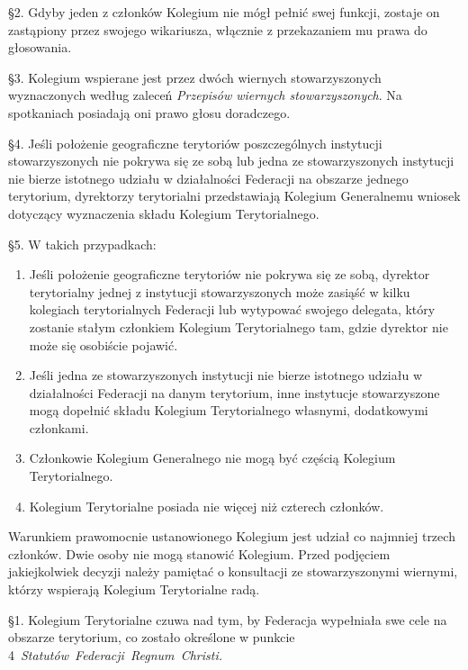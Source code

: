 \S{}2. Gdyby jeden z członków Kolegium nie mógł pełnić swej funkcji, zostaje on zastąpiony przez swojego wikariusza, włącznie z przekazaniem mu prawa do głosowania.

\S{}3. Kolegium wspierane jest przez dwóch wiernych stowarzyszonych wyznaczonych według zaleceń {\em Przepisów wiernych stowarzyszonych}. Na spotkaniach posiadają oni prawo głosu doradczego.

\S{}4. Jeśli położenie geograficzne terytoriów poszczególnych instytucji stowarzyszonych nie pokrywa się ze sobą lub jedna ze stowarzyszonych instytucji nie bierze istotnego udziału w działalności Federacji na obszarze jednego terytorium, dyrektorzy terytorialni przedstawiają Kolegium Generalnemu wniosek dotyczący wyznaczenia składu Kolegium Terytorialnego.

\S{}5. W takich przypadkach:
\begin{enumerate}
	
	\item Jeśli położenie geograficzne terytoriów nie pokrywa się ze sobą, dyrektor terytorialny jednej z instytucji stowarzyszonych może zasiąść w kilku kolegiach terytorialnych Federacji lub wytypować swojego delegata, który zostanie stałym członkiem Kolegium Terytorialnego tam, gdzie dyrektor nie może się osobiście pojawić.
	
	\item Jeśli jedna ze stowarzyszonych instytucji nie bierze istotnego udziału w działalności Federacji na danym terytorium, inne instytucje stowarzyszone mogą dopełnić składu Kolegium Terytorialnego własnymi, dodatkowymi członkami.
	
	\item Członkowie Kolegium Generalnego nie mogą być częścią Kolegium Terytorialnego.
	
	\item Kolegium Terytorialne posiada nie więcej niż czterech członków.
\end{enumerate}

 Warunkiem prawomocnie ustanowionego Kolegium jest udział co najmniej trzech członków. Dwie osoby nie mogą stanowić Kolegium. Przed podjęciem jakiejkolwiek decyzji należy pamiętać o konsultacji ze stowarzyszonymi wiernymi, którzy wspierają Kolegium Terytorialne radą.

\filbreak{}

 \S{}1. Kolegium Terytorialne czuwa nad tym, by Federacja wypełniała swe cele na obszarze terytorium, co zostało określone w punkcie \mbox{4 {\em Statutów Federacji Regnum Christi.}}

